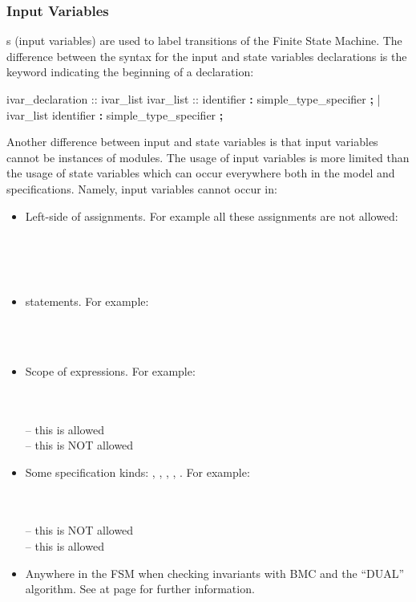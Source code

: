 \subsubsection{Input Variables}
\label{Input Variables}
%
s (input variables) are used to label transitions of the
Finite State Machine. The difference between the syntax for the input
and state variables declarations is the keyword indicating the
beginning of a declaration:
%
\begin{Grammar}
ivar_declaration ::  ivar_list
ivar_list :: identifier \textbf{:} simple_type_specifier \textbf{;}
          | ivar_list identifier \textbf{:} simple_type_specifier \textbf{;}
\end{Grammar}
%
Another difference between input and state variables is that input
variables cannot be instances of modules.
%
The usage of input variables is more limited than the usage of state
variables which can occur everywhere both in the model and
specifications.
%
Namely, input variables cannot occur in:

\begin{itemize}
\item Left-side of assignments. For example all these assignments 
  are not allowed:

  \\
  \\
  \\

\item {} statements. For example:

  \\
  \\

\item Scope of  expressions. For example:

  \\
  \\
   -- this is allowed\\
   -- this is NOT allowed

\item Some specification kinds: , ,
      , , . For example:

  \\
  \\
   -- this is NOT allowed\\
   -- this is allowed


\item Anywhere in the FSM when checking invariants with BMC and the
  ``DUAL'' algorithm. See at page \pageref{bmc::dual} for further
  information.

\end{itemize}


